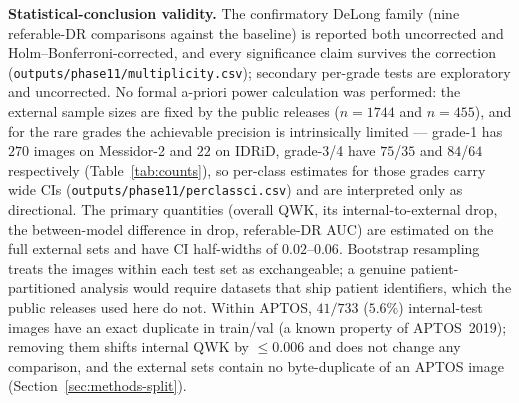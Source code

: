 \documentclass[journal]{IEEEtran}
\renewcommand{\_}{\origunderscore\allowbreak}
\begin{document}
\textbf{Statistical-conclusion validity.} The confirmatory DeLong family (nine
referable-DR comparisons against the baseline) is reported both uncorrected and
Holm--Bonferroni-corrected, and every significance claim survives the correction
(\texttt{outputs/\allowbreak{}phase11/\allowbreak{}multiplicity.csv}); secondary per-grade tests are
exploratory and uncorrected. No formal a-priori power calculation was performed:
the external sample sizes are fixed by the public releases ($n=1744$ and $n=455$),
and for the rare grades the achievable precision is intrinsically limited ---
grade-1 has $270$ images on Messidor-2 and $22$ on IDRiD, grade-3/4 have $75$/$35$
and $84$/$64$ respectively (Table~\ref{tab:counts}), so per-class estimates for
those grades carry wide CIs (\texttt{outputs/\allowbreak{}phase11/\allowbreak{}per\_class\_ci.csv}) and are
interpreted only as directional. The primary quantities (overall QWK, its
internal-to-external drop, the between-model difference in drop, referable-DR
AUC) are estimated on the full external sets and have CI half-widths of
$0.02$--$0.06$. Bootstrap resampling treats the images within each test set as
exchangeable; a genuine patient-partitioned analysis would require datasets that
ship patient identifiers, which the public releases used here do not. Within
APTOS, $41/733$ ($5.6\%$) internal-test images have an exact duplicate in
train/val (a known property of APTOS~2019); removing them shifts internal QWK by
$\leq 0.006$ and does not change any comparison, and the external sets contain no
byte-duplicate of an APTOS image (Section~\ref{sec:methods-split}).
\end{document}

